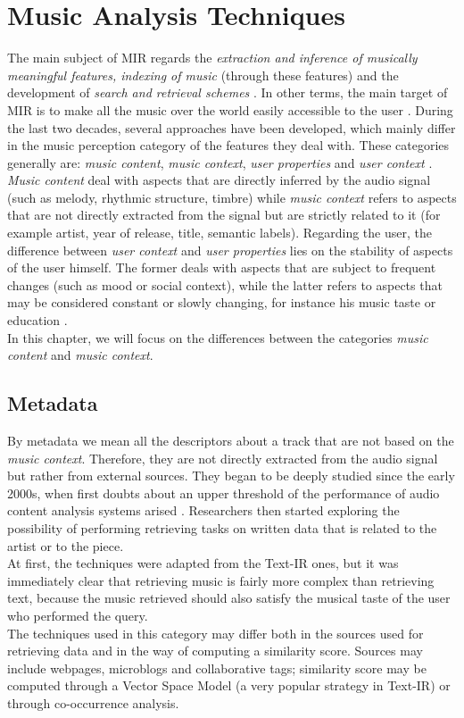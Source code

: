 \chapter{Music Analysis Techniques} 
\label{Chapter2} 

The main subject of MIR regards the \textit{extraction and inference of musically meaningful features, indexing of music} (through these features) and the development of \textit{search and retrieval schemes} \cite{downieMIR}. In other terms, the main target of MIR is to make all the music over the world easily accessible to the user \cite{downieMIR}. During the last two decades, several approaches have been developed, which mainly differ in the music perception category of the features they deal with. These categories generally are: \textit{music content}, \textit{music context}, \textit{user properties} and \textit{user context} \cite{gomez14}. \textit{Music content} deal with aspects that are directly inferred by the audio signal (such as melody, rhythmic structure, timbre) while \textit{music context} refers to aspects that are not directly extracted from the signal but are strictly related to it (for example artist, year of release, title, semantic labels). Regarding the user, the difference between \textit{user context} and \textit{user properties} lies on the stability of aspects of the user himself. The former deals with aspects that are subject to frequent changes (such as mood or social context), while the latter refers to aspects that may be considered constant or slowly changing, for instance his music taste or education \cite{gomez14}. \\In this chapter, we will focus on the differences between the categories \textit{music content} and \textit{music context}. 


\section{Metadata}
By metadata we mean all the descriptors about a track that are not based on the \textit{music context}. Therefore, they are not directly extracted from the audio signal but rather from external sources. They began to be deeply studied since the early 2000s, when first doubts about an upper threshold of the performance of audio content analysis systems arised \cite{aucou04}. Researchers then started exploring the possibility of performing retrieving tasks on written data that is related to the artist or to the piece. \\At first, the techniques were adapted from the Text-IR ones, but it was immediately clear that retrieving music is fairly more complex than retrieving text, because the music retrieved should also satisfy the musical taste of the user who performed the query. 
\\The techniques used in this category may differ both in the sources used for retrieving data and in the way of computing a similarity score. Sources may include webpages, microblogs and collaborative tags; similarity score may be computed through a Vector Space Model (a very popular strategy in Text-IR) or through co-occurrence analysis.


